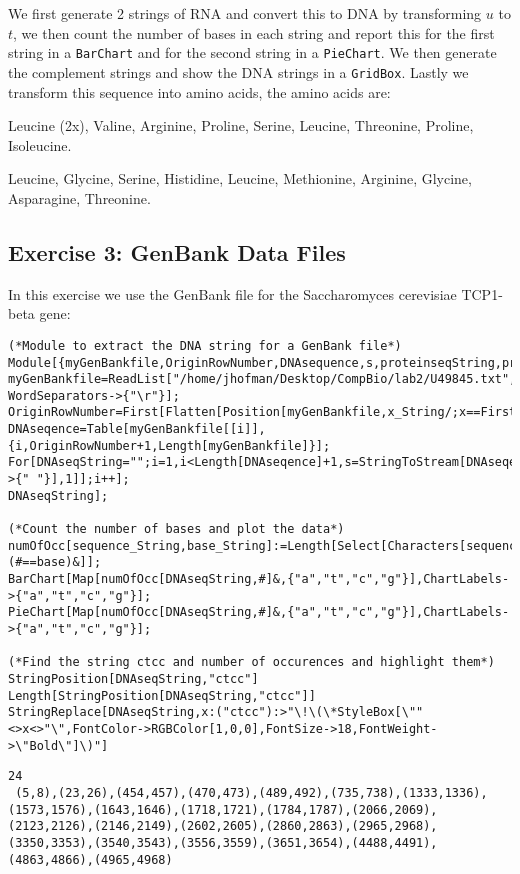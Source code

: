 \documentclass[11pt,a4paper,onecolumn]{article}
\begin{document}
\begin{figure}[H]
  \centering
\end{figure}

We first generate 2 strings of RNA and convert this to DNA by transforming $u$ to $t$, we then count the number of bases in each string and report this for the first string in a \texttt{BarChart} and for the second string in a \texttt{PieChart}. We then generate the complement strings and show the DNA strings in a \texttt{GridBox}. Lastly we transform this sequence into amino acids, the amino acids are:

Leucine (2x), Valine, Arginine, Proline, Serine, Leucine, Threonine, Proline, Isoleucine.

Leucine, Glycine, Serine, Histidine, Leucine, Methionine, Arginine, Glycine, Asparagine, Threonine.

\subsection{Exercise 3: GenBank Data Files}

In this exercise we use the GenBank file for the Saccharomyces cerevisiae TCP1-beta gene:

\begin{lstlisting}[mathescape]
(*Module to extract the DNA string for a GenBank file*)
Module[{myGenBankfile,OriginRowNumber,DNAsequence,s,proteinseqString,proteinSeqStart,proteinSeqEnd,proteinSeq},
myGenBankfile=ReadList["/home/jhofman/Desktop/CompBio/lab2/U49845.txt",Word, WordSeparators->{"\r"}];
OriginRowNumber=First[Flatten[Position[myGenBankfile,x_String/;x==First[Select[myGenBankfile,StringMatchQ[#,"ORIGIN*"]&]]]]];
DNAseqence=Table[myGenBankfile[[i]],{i,OriginRowNumber+1,Length[myGenBankfile]}];
For[DNAseqString="";i=1,i<Length[DNAseqence]+1,s=StringToStream[DNAseqence[[i]]];DNAseqString=DNAseqString<>StringJoin[Drop[ReadList[s,Word,RecordSeparators->{" "}],1]];i++];
DNAseqString];

(*Count the number of bases and plot the data*)
numOfOcc[sequence_String,base_String]:=Length[Select[Characters[sequence],(#==base)&]];
BarChart[Map[numOfOcc[DNAseqString,#]&,{"a","t","c","g"}],ChartLabels->{"a","t","c","g"}];
PieChart[Map[numOfOcc[DNAseqString,#]&,{"a","t","c","g"}],ChartLabels->{"a","t","c","g"}];

(*Find the string ctcc and number of occurences and highlight them*)
StringPosition[DNAseqString,"ctcc"]
Length[StringPosition[DNAseqString,"ctcc"]]
StringReplace[DNAseqString,x:("ctcc"):>"\!\(\*StyleBox[\""<>x<>"\",FontColor->RGBColor[1,0,0],FontSize->18,FontWeight->\"Bold\"]\)"]
\end{lstlisting}
\begin{lstlisting}[mathescape]
24 
 (5,8),(23,26),(454,457),(470,473),(489,492),(735,738),(1333,1336),(1573,1576),(1643,1646),(1718,1721),(1784,1787),(2066,2069),(2123,2126),(2146,2149),(2602,2605),(2860,2863),(2965,2968),(3350,3353),(3540,3543),(3556,3559),(3651,3654),(4488,4491),(4863,4866),(4965,4968)
\end{lstlisting}
\end{document}
